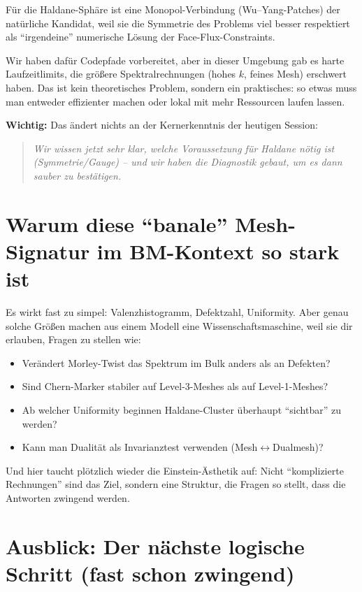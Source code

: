 \documentclass[11pt,a4paper]{article}
\begin{document}
Für die Haldane-Sphäre ist eine Monopol-Verbindung (Wu--Yang-Patches) der natürliche Kandidat, weil sie die Symmetrie des Problems viel besser respektiert als ``irgendeine'' numerische Lösung der Face-Flux-Constraints.

Wir haben dafür Codepfade vorbereitet, aber in dieser Umgebung gab es harte Laufzeitlimits, die größere Spektralrechnungen (hohes $k$, feines Mesh) erschwert haben. Das ist kein theoretisches Problem, sondern ein praktisches: so etwas muss man entweder effizienter machen oder lokal mit mehr Ressourcen laufen lassen.

\textbf{Wichtig:} Das ändert nichts an der Kernerkenntnis der heutigen Session:

\begin{quote}
\emph{Wir wissen jetzt sehr klar, welche Voraussetzung für Haldane nötig ist (Symmetrie/Gauge) -- und wir haben die Diagnostik gebaut, um es dann sauber zu bestätigen.}
\end{quote}

\section{Warum diese ``banale'' Mesh-Signatur im BM-Kontext so stark ist}

Es wirkt fast zu simpel: Valenzhistogramm, Defektzahl, Uniformity. Aber genau solche Größen machen aus einem Modell eine Wissenschaftsmaschine, weil sie dir erlauben, Fragen zu stellen wie:
\begin{itemize}[leftmargin=*,itemsep=0.5em]
    \item Verändert Morley-Twist das Spektrum im Bulk anders als an Defekten?
    \item Sind Chern-Marker stabiler auf Level-3-Meshes als auf Level-1-Meshes?
    \item Ab welcher Uniformity beginnen Haldane-Cluster überhaupt ``sichtbar'' zu werden?
    \item Kann man Dualität als Invarianztest verwenden (Mesh$\leftrightarrow$Dualmesh)?
\end{itemize}

Und hier taucht plötzlich wieder die Einstein-Ästhetik auf: Nicht ``komplizierte Rechnungen'' sind das Ziel, sondern eine Struktur, die Fragen so stellt, dass die Antworten zwingend werden.

\section{Ausblick: Der nächste logische Schritt (fast schon zwingend)}
\end{document}
